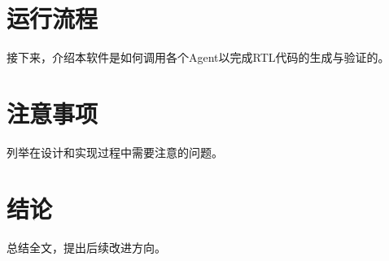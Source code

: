 \documentclass[UTF8]{ctexart}
\begin{document}
\section{运行流程}
接下来，介绍本软件是如何调用各个Agent以完成RTL代码的生成与验证的。


\section{注意事项}
列举在设计和实现过程中需要注意的问题。

\section{结论}
总结全文，提出后续改进方向。
\end{document}
